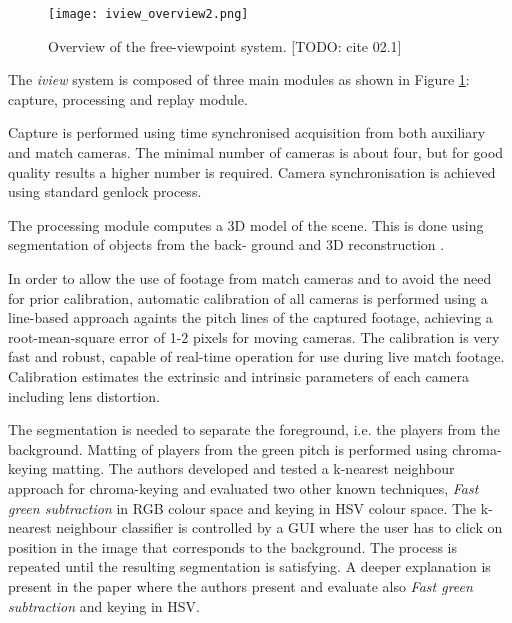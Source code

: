 
\begin{figure}[htbp]
\centerline{\texttt{[image: iview\_overview2.png]}}
\caption{Overview of the free-viewpoint system. [TODO: cite 02.1]}
\label{fig:iview_overview}
\end{figure}


The \textit{iview} system is composed of three main modules as shown in Figure \ref{fig:iview_overview}: 
capture, processing and replay module.

Capture is performed using time synchronised acquisition from both auxiliary and
match cameras.
The minimal number of cameras is about four, but for good quality results a higher number is required.
Camera synchronisation is achieved using standard genlock process.

The processing module computes a 3D model of the scene.
This is done using segmentation of objects from the back-
ground and 3D reconstruction \cite{2.1_iview}.

In order to allow the use of footage from match cameras and to avoid the need for prior calibration, 
automatic calibration of all cameras is performed using a line-based approach againts the pitch lines of the captured footage, 
achieving a root-mean-square error of 1-2 pixels for moving cameras. 
The calibration is very fast and robust, capable of real-time operation for use during live match footage. 
Calibration estimates the extrinsic and intrinsic parameters of each camera including lens distortion.

The segmentation is needed to separate the foreground, i.e. the players from the background.
Matting of players from the green pitch is performed using chroma-keying matting. 
The authors developed and tested a k-nearest neighbour approach for chroma-keying and evaluated two other known techniques,
\textit{Fast green subtraction} in RGB colour space and keying in HSV colour space.
The k-nearest neighbour classifier is controlled by a GUI where the user has to click on position in the image that corresponds
to the background. 
The process is repeated until the resulting segmentation is satisfying.
A deeper explanation is present in the paper \cite{2.1_iview} where the authors present and evaluate also 
\textit{Fast green subtraction} and keying in HSV.


